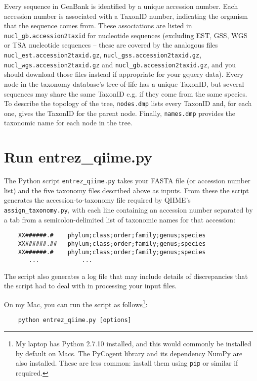 \documentclass[11pt]{amsart}
\begin{document}
Every sequence in GenBank is identified by a unique accession number. Each accession number is associated with a TaxonID number, indicating the organism that the sequence comes from. These associations are listed in \verb|nucl_gb.accession2taxid| for nucleotide sequences (excluding EST, GSS, WGS or TSA nucleotide sequences -- these are covered by the analogous files \verb|nucl_est.accession2taxid.gz|, \verb|nucl_gss.accession2taxid.gz|, \verb|nucl_wgs.accession2taxid.gz| and \verb|nucl_gb.accession2taxid.gz|, and you should download those files instead if appropriate for your gquery data). Every node in the taxonomy database's tree-of-life has a unique TaxonID, but several sequences may share the same TaxonID e.g. if they come from the same species. To describe the topology of the tree, \verb|nodes.dmp| lists every TaxonID and, for each one, gives the TaxonID for the parent node. Finally, \verb|names.dmp| provides the taxonomic name for each node in the tree.

\section{Run entrez\_qiime.py}
\label{section:python}

The Python script \verb|entrez_qiime.py| takes your FASTA file (or accession number list) and the five taxonomy files described above as inputs. From these the script generates the accession-to-taxonomy file required by QIIME's \verb|assign_taxonomy.py|, with each line containing an accession number separated by a tab from a semicolon-delimited list of taxonomic names for that accession:

\begin{verbatim}
    XX######.#    phylum;class;order;family;genus;species
    XX######.##   phylum;class;order;family;genus;species
    XX######.#    phylum;class;order;family;genus;species
       ...            ...
\end{verbatim}

The script also generates a log file that may include details of discrepancies that the script had to deal with in processing your input files.

On my Mac, you can run the script as follows\footnote{My laptop has Python 2.7.10 installed, and this would commonly be installed by default on Macs. The PyCogent library and its dependency NumPy are also installed. These are less common: install them using \texttt{pip} or similar if required.}:

\begin{verbatim}
    python entrez_qiime.py [options]
\end{verbatim}
\end{document}
